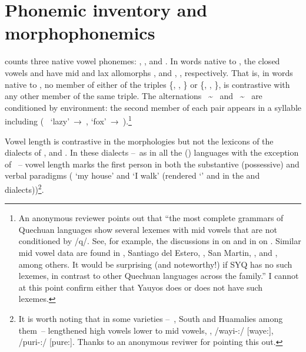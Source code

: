 {\section{Phonemic inventory and morphophonemics}\label{sec:phoinvmor}
\SYQ{} counts three native vowel phonemes: , , and . In words native to \SYQ, the closed vowels  and  have mid and lax allomorphs \textipa{[e]}, \textipa{[ɪ]} and \textipa{[o]}, \textipa{[υ]}, respectively. That is, in words native to \SYQ, no member of either of the triples \{\textipa{[i]}, \textipa{[e]}, \textipa{[ɪ]}\} or \{\textipa{[u]}, \textipa{[o]}, \textipa{[υ]}\}, is contrastive with any other member of the same triple. The alternations \textipa{[i]}~\textasciitilde~\textipa{[e]} and \textipa{[u]}~\textasciitilde~\textipa{[o]} are conditioned by environment: the second member of each pair appears in a syllable including  ( \ ‘lazy’~→~\textipa{[qeλa]},  ‘fox’~→~\textipa{[atoq]}).\footnote{An anonymous reviewer points out that “the most complete grammars of Quechuan languages show several lexemes with mid vowels that are not conditioned by /q/. See, for example, the discussions in \citet[46--51]{Cusihuaman76} on  and in \citet[xiv--xv]{swisshelm1972} on . Similar mid vowel data are found in , Santiago del Estero, , San Martin, , and , among others. It would be surprising (and noteworthy!) if SYQ has no such lexemes, in contrast to other Quechuan languages across the family.” I cannot at this point confirm either that Yauyos does or does not have such lexemes.}

Vowel length is contrastive in the morphologies but not the lexicons of the dialects of \ACH, \CH{} and \SP. In these dialects --~as in all the \QI{} (\QB) languages with the exception of ~-- vowel length marks the first person in both the substantive (possessive) and verbal paradigms ( ‘my house’ and  ‘I walk’ (rendered ‘’ and  in the \AMV{} and \LT{} dialects))\footnote{It is worth noting that in some \QI{} varieties --~, South  and Huamalies among them~-- lengthened high vowels lower to mid vowels, \eg, /wayi-:/ [waye:], /puri-:/ [pure:]. Thanks to an anonymous reviwer for pointing this out.}. 

}
